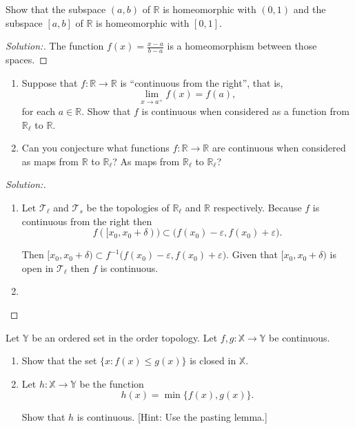 \documentclass[a4paper,12pt, reqno]{article}
\theoremstyle{definition}
\newenvironment{exerr}[1]{
  \renewcommand\theexeralt{#1}
  \exeralt
}{\endexeralt}
\newenvironment{solution}{\begin{proof}[Solution:]}{\end{proof}}
\newcommand{\R}{\mathbb{R}}
\newcommand{\T}{\mathscr{T}}
\newcommand{\X}{\mathbb{X}}
\newcommand{\Y}{\mathbb{Y}}
\begin{document}
\begin{exerr}{5}
  Show that the subspace $(a,b)$ of $\R$ is homeomorphic with $(0,1)$ and the subspace $[a,b]$ of $\R$ is homeomorphic with $[0,1]$.
\end{exerr}
\begin{solution}
  The function $f(x) = \frac{x-a}{b-a}$ is a homeomorphism between those spaces.
\end{solution}

\begin{exerr}{7}\hfill
  \begin{enumerate}[label=(\alph*)]
    \item Suppose that $f:\R\to\R$ is ``continuous from the right'', that is,
          \begin{equation*}
            \lim_{x\to a^+}f(x) = f(a),
          \end{equation*}
          for each $a\in\R$. Show that $f$ is continuous when considered as a function from $\R_{\ell}$ to $\R$.
    \item Can you conjecture what functions $f:\R\to\R$ are continuous when considered as maps from $\R$ to $\R_{\ell}$? As maps from $\R_{\ell}$ to $\R_{\ell}$?
  \end{enumerate}
\end{exerr}
\begin{solution}\hfill
  \begin{enumerate}[label=(\alph*)]
    \item Let $\T_{\ell}$ and $\T_{s}$ be the topologies of $\R_{\ell}$ and $\R$ respectively. Because $f$ is continuous from the right then
          \begin{equation*}
            f([x_{0},x_{0}+\delta)) \subset \big( f(x_{0})-\varepsilon, f(x_{0})+\varepsilon \big).
          \end{equation*}

          Then $[x_{0},x_{0}+\delta)\subset f^{-1}\big( f(x_{0})-\varepsilon,f(x_{0})+\varepsilon \big)$. Given that $[x_{0},x_{0}+\delta)$ is open in $\T_{\ell}$ then $f$ is continuous.
    \item
  \end{enumerate}
\end{solution}

\begin{exerr}{8}
  Let $\Y$ be an ordered set in the order topology. Let $f,g:\X\to\Y$ be continuous.
  \begin{enumerate}[label=(\alph*)]
    \item Show that the set $\{ x : f(x)\leq g(x) \}$ is closed in $\X$.
    \item Let $h:\X\to\Y$ be the function
          \begin{equation*}
            h(x) = \min\{ f(x), g(x) \}.
          \end{equation*}

          Show that $h$ is continuous. [Hint: Use the pasting lemma.]
  \end{enumerate}
\end{exerr}
\end{document}
